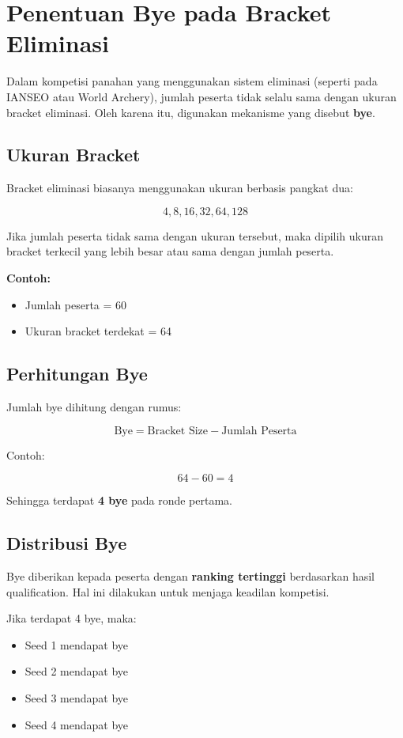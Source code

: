 \section{Penentuan Bye pada Bracket Eliminasi}

Dalam kompetisi panahan yang menggunakan sistem eliminasi (seperti pada IANSEO atau World Archery), jumlah peserta tidak selalu sama dengan ukuran bracket eliminasi. Oleh karena itu, digunakan mekanisme yang disebut \textbf{bye}.

\subsection{Ukuran Bracket}

Bracket eliminasi biasanya menggunakan ukuran berbasis pangkat dua:

\[
4, 8, 16, 32, 64, 128
\]

Jika jumlah peserta tidak sama dengan ukuran tersebut, maka dipilih ukuran bracket terkecil yang lebih besar atau sama dengan jumlah peserta.

\textbf{Contoh:}

\begin{itemize}
\item Jumlah peserta = 60
\item Ukuran bracket terdekat = 64
\end{itemize}

\subsection{Perhitungan Bye}

Jumlah bye dihitung dengan rumus:

\[
\text{Bye} = \text{Bracket Size} - \text{Jumlah Peserta}
\]

Contoh:

\[
64 - 60 = 4
\]

Sehingga terdapat \textbf{4 bye} pada ronde pertama.

\subsection{Distribusi Bye}

Bye diberikan kepada peserta dengan \textbf{ranking tertinggi} berdasarkan hasil qualification. Hal ini dilakukan untuk menjaga keadilan kompetisi.

Jika terdapat 4 bye, maka:

\begin{itemize}
\item Seed 1 mendapat bye
\item Seed 2 mendapat bye
\item Seed 3 mendapat bye
\item Seed 4 mendapat bye
\end{itemize}

